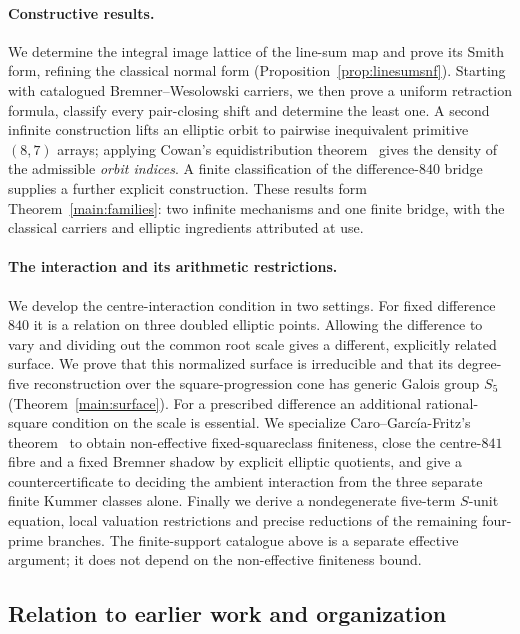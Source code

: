 \paragraph{Constructive results.}
We determine the integral image lattice of the line-sum map and prove its
Smith form, refining the classical normal form
(Proposition~\ref{prop:linesumsnf}). Starting with catalogued
Bremner--Wesolowski carriers, we then prove a uniform retraction formula,
classify every pair-closing shift and determine the least one. A second
infinite construction lifts an elliptic orbit to pairwise inequivalent
primitive $(8,7)$ arrays; applying Cowan's equidistribution
theorem~\cite{COW20} gives the density of the admissible \emph{orbit
indices}. A finite classification of the difference-$840$ bridge supplies
a further explicit construction. These results form
Theorem~\ref{main:families}: two infinite mechanisms and one finite bridge,
with the classical carriers and elliptic ingredients attributed at use.

\paragraph{The interaction and its arithmetic restrictions.}
We develop the centre-interaction condition in two settings. For fixed
difference $840$ it is a relation on three doubled elliptic points.
Allowing the difference to vary and dividing out the common root scale
gives a different, explicitly related surface. We prove that this
normalized surface is irreducible and that its degree-five reconstruction
over the square-progression cone has generic Galois group $S_5$
(Theorem~\ref{main:surface}). For a prescribed
difference an additional rational-square condition on the scale is
essential. We specialize Caro--Garc\'ia-Fritz's theorem~\cite{CGF25} to
obtain non-effective fixed-squareclass finiteness, close the centre-$841$
fibre and a fixed Bremner shadow by explicit elliptic quotients, and give
a countercertificate to deciding the ambient interaction from the three
separate finite Kummer classes alone. Finally we derive a nondegenerate
five-term $S$-unit equation, local valuation restrictions and precise
reductions of the remaining four-prime branches. The finite-support
catalogue above is a separate effective argument; it does not depend on
the non-effective finiteness bound.

\subsection{Relation to earlier work and organization}


